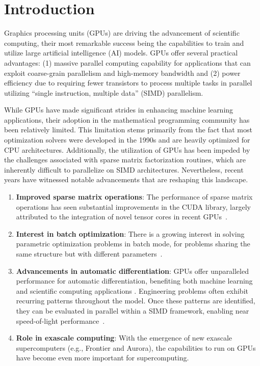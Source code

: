 \section{Introduction}
Graphics processing units (GPUs) are driving the advancement of scientific computing, their most remarkable success being the capabilities to train and utilize large artificial intelligence (AI) models.
GPUs offer several practical advantages: (1) massive parallel computing capability for applications that can exploit coarse-grain parallelism and high-memory bandwidth and (2) power efficiency due to requiring fewer transistors to process multiple tasks in parallel utilizing ``single instruction, multiple data'' (SIMD) parallelism.

While GPUs have made significant strides in enhancing machine learning applications, their adoption in the mathematical programming community has been relatively limited.
This limitation stems primarily from the fact that most optimization solvers were developed in the 1990s and are heavily optimized for CPU architectures.
Additionally, the utilization of GPUs has been impeded by the challenges associated with sparse matrix factorization routines, which are inherently difficult to parallelize on SIMD architectures. Nevertheless, recent years have witnessed notable advancements that are reshaping this landscape.
\begin{enumerate}
  \item \textbf{Improved sparse matrix operations}: The performance of sparse matrix operations has seen substantial improvements in the CUDA library, largely attributed to the integration of novel tensor cores in recent GPUs~\cite{markidis2018nvidia}.
  \item \textbf{Interest in batch optimization}: There is a growing interest in solving parametric optimization problems in batch mode, for problems sharing the same structure but with different parameters~\cite{amos2017optnet,pineda2022theseus}.
  \item \textbf{Advancements in automatic differentiation}: GPUs offer unparalleled performance for automatic differentiation, benefiting both machine learning~\cite{jax2018github} and scientific computing applications \cite{enzyme2021}. Engineering problems often exhibit recurring patterns throughout the model. Once these patterns are identified, they can be evaluated in parallel within a SIMD framework, enabling near speed-of-light performance~\cite{shin2023accelerating}.
  \item \textbf{Role in exascale computing}: With the emergence of new exascale supercomputers (e.g., Frontier and Aurora), the capabilities to run on GPUs have become even more important for supercomputing.
\end{enumerate}

